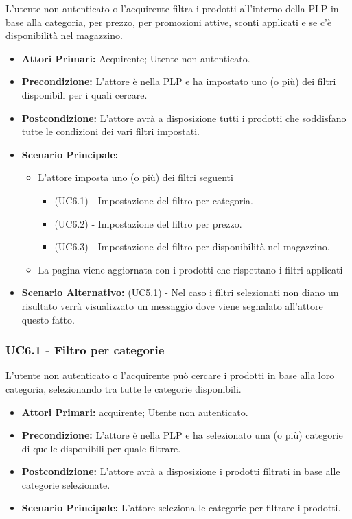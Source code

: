 L'utente non autenticato o l'acquirente filtra i prodotti all'interno della PLP in base alla categoria, per prezzo, per promozioni attive, sconti applicati e se c'è disponibilità nel magazzino.
\begin{itemize}
    \item \textbf{Attori Primari:} Acquirente; Utente non autenticato.
    \item \textbf{Precondizione:} L'attore è nella PLP e ha impostato uno (o più) dei filtri disponibili per i quali cercare.
    \item \textbf{Postcondizione:} L'attore avrà a disposizione tutti i prodotti che soddisfano tutte le condizioni dei vari filtri impostati.
    \item \textbf{Scenario Principale:}
    \begin{itemize}
        \item L'attore imposta uno (o più) dei filtri seguenti 
        \begin{itemize}
            \item (UC6.1) - Impostazione del filtro per categoria.
            \item (UC6.2) - Impostazione del filtro per prezzo.
            \item (UC6.3) - Impostazione del filtro per disponibilità nel magazzino.
        \end{itemize}
        \item La pagina viene aggiornata con i prodotti che rispettano i filtri applicati
    \end{itemize}
    \item \textbf{Scenario Alternativo:} (UC5.1) - Nel caso i filtri selezionati non diano un risultato verrà visualizzato un messaggio dove viene segnalato all'attore questo fatto.
\end{itemize}

\subsubsection{UC6.1 - Filtro per categorie} \label{UC6.1}
L'utente non autenticato o l'acquirente può cercare i prodotti in base alla loro categoria, selezionando tra tutte le categorie disponibili.
\begin{itemize}
    \item \textbf{Attori Primari:} acquirente; Utente non autenticato.
    \item \textbf{Precondizione:} L'attore è nella PLP e ha selezionato una (o più) categorie di quelle disponibili per quale filtrare.
    \item \textbf{Postcondizione:} L'attore avrà a disposizione i prodotti filtrati in base alle categorie selezionate.
    \item \textbf{Scenario Principale:} L'attore seleziona le categorie per filtrare i prodotti.
\end{itemize}

